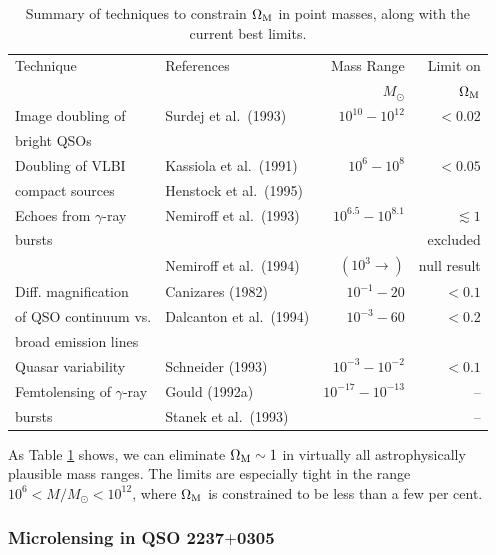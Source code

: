 \documentclass[a4paper,10pt]{article} %
\newcommand{\la}{\lesssim}
\begin{document}
\begin{table}
  \caption{Summary of techniques to constrain $\Omega_{\rm M}$ in
    point masses, along with the current best limits.}
\medskip %
  \begin{center}
  \begin{tabular}{|l|lrr|}
  \hline\hline
    Technique & References & Mass Range & Limit on \\
    && $M_\odot$ & $\Omega_{\rm M}$ \\
  \hline\hline
    Image doubling of & Surdej et al.\ (1993) &
    $10^{10}-10^{12}$ & $<0.02$ \\
    bright QSOs &&&\\
  \hline
    Doubling of VLBI & Kassiola et al.\ (1991) &
    $10^6-10^8$ & $<0.05$ \\
    compact sources & Henstock et al.\ (1995) &&\\
  \hline
    Echoes from $\gamma$-ray & Nemiroff et al.\ (1993) &
    $10^{6.5}-10^{8.1}$ & $\la1$ \\
    bursts & & & excluded \\
    & Nemiroff et al.\ (1994) & $(10^3\to)$ & null result \\
  \hline
    Diff. magnification & Canizares (1982) &
    $10^{-1}-20$ & $<0.1$ \\
    of QSO continuum vs. & Dalcanton et al.\ (1994) &
    $10^{-3}-60$ & $<0.2$ \\
    broad emission lines &&&\\
  \hline
    Quasar variability & Schneider (1993) &
    $10^{-3}-10^{-2}$ & $<0.1$ \\
  \hline
    Femtolensing of $\gamma$-ray & Gould (1992a) &
    $10^{-17}-10^{-13}$ & -- \\
    bursts & Stanek et al.\ (1993) & & -- \\
  \hline\hline
  \end{tabular}
  \end{center}
\label{NB:tab2.1}
\end{table}

As Table \ref{NB:tab2.1} shows, we can eliminate $\Omega_{\rm M}\sim1$
in virtually all astrophysically plausible mass ranges. The limits are
especially tight in the range $10^6<M/M_\odot<10^{12}$, where
$\Omega_{\rm M}$ is constrained to be less than a few per cent.

\subsubsection{Microlensing in QSO 2237$+$0305}
\label{NB:subsubsect2.3.3}
\end{document}
